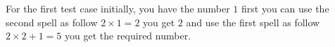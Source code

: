 For the first test case initially, you have the number $1$ first you can use the second spell
as follow $2 \times 1 = 2$ you get $2$ and use the first spell as follow $2 \times 2 + 1 = 5$ you get the required number.
